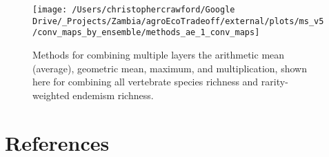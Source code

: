 \documentclass[
]{article}
\begin{document}
\begin{figure}
\texttt{[image: /Users/christophercrawford/Google Drive/\_Projects/Zambia/agroEcoTradeoff/external/plots/ms\_v5/conv\_maps\_by\_ensemble/methods\_ae\_1\_conv\_maps]} \caption{Methods for combining multiple layers the arithmetic mean (average), geometric mean, maximum, and multiplication, shown here for combining all vertebrate species richness and rarity-weighted endemism richness.}\label{fig:conv-maps-methods-ae-1}
\end{figure}

\newpage

\hypertarget{references}{%
\section*{References}\label{references}}
\end{document}
